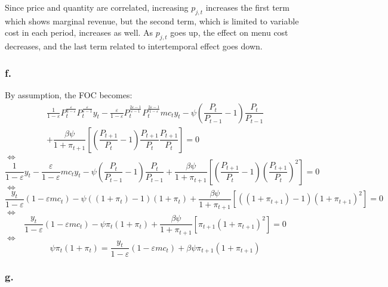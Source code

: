 \documentclass{article}
\begin{document}
Since price and quantity are correlated, increasing $p_{j, t}$ increases the first term which shows marginal revenue, but the second term, which is limited to variable cost in each period, increases as well. As $p_{j,t}$ goes up, the effect on menu cost decreases, and the last term related to intertemporal effect goes down. 

\subsubsection*{f.}

By assumption, the FOC becomes:
\begin{multline*}
    \frac{1}{1-\varepsilon}P_{t}^{\frac{\varepsilon}{1-\varepsilon}}P_{t}^{\frac{\varepsilon}{\varepsilon-1}}y_{t}-\frac{\varepsilon}{1-\varepsilon}P_{t}^{\frac{2\varepsilon-1}{\varepsilon-1}}P_{t}^{\frac{2\varepsilon-1}{1-\varepsilon}}mc_{t}y_{t}-\psi\left(\dfrac{P_{t}}{P_{t-1}}-1\right)\dfrac{P_{t}}{P_{t-1}}\\
    +\dfrac{\beta\psi}{1+\pi_{t+1}}\left[\left(\dfrac{P_{t+1}}{P_{t}}-1\right)\dfrac{P_{t+1}}{P_{t}}\dfrac{P_{t+1}}{P_{t}}\right]=0
\end{multline*}
$\iff$
\begin{equation*}
    \frac{1}{1-\varepsilon}y_{t}-\frac{\varepsilon}{1-\varepsilon}mc_{t}y_{t}-\psi\left(\dfrac{P_{t}}{P_{t-1}}-1\right)\dfrac{P_{t}}{P_{t-1}}+\dfrac{\beta\psi}{1+\pi_{t+1}}\left[\left(\dfrac{P_{t+1}}{P_{t}}-1\right)\left(\dfrac{P_{t+1}}{P_{t}}\right)^{2}\right]=0
\end{equation*}
$\iff$
\begin{equation*}
    \frac{y_{t}}{1-\varepsilon}\left(1-\varepsilon mc_{t}\right)-\psi\left(\left(1+\pi_{t}\right)-1\right)\left(1+\pi_{t}\right)+\dfrac{\beta\psi}{1+\pi_{t+1}}\left[\left(\left(1+\pi_{t+1}\right)-1\right)\left(1+\pi_{t+1}\right)^{2}\right]=0
\end{equation*}
$\iff$
\begin{equation*}
    \frac{y_{t}}{1-\varepsilon}\left(1-\varepsilon mc_{t}\right)-\psi\pi_{t}\left(1+\pi_{t}\right)+\dfrac{\beta\psi}{1+\pi_{t+1}}\left[\pi_{t+1}\left(1+\pi_{t+1}\right)^{2}\right]=0
\end{equation*}
$\iff$
\begin{equation*}
    \psi\pi_{t}\left(1+\pi_{t}\right)=\frac{y_{t}}{1-\varepsilon}\left(1-\varepsilon mc_{t}\right)+\beta\psi\pi_{t+1}\left(1+\pi_{t+1}\right)
\end{equation*}

\subsubsection*{g.}
\end{document}

